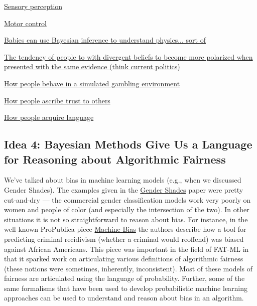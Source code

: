 \documentclass[assignment01_Solutions]{subfiles}
\begin{document}
\bi
\item \href{https://www.sciencedirect.com/science/article/pii/S0022249615000061}{Sensory perception}
\item \href{https://www.nature.com/articles/nn963}{Motor control}
\item \href{http://web.mit.edu/cocosci/Papers/Science-2011-Teglas-1054-9.pdf}{Babies can use Bayesian inference to understand physics... sort of}
\item \href{https://www.ncbi.nlm.nih.gov/pubmed/24730598}{The tendency of people to with divergent beliefs to become more polarized when presented with the same evidence (think current politics)}
\item \href{https://www.sciencedirect.com/science/article/pii/S0022249608001090}{How people behave in a simulated gambling environment}
\item \href{https://arxiv.org/abs/1806.03916}{How people ascribe trust to others}
\item \href{https://www.sciencedirect.com/science/article/pii/S1364661306001318}{How people acquire language}
\ei


\subsection*{Idea 4: Bayesian Methods Give Us a Language for Reasoning about Algorithmic Fairness}

We've talked about bias in machine learning models (e.g., when we discussed Gender Shades).  The examples given in the \href{http://gendershades.org/overview.html}{Gender Shades} paper were pretty cut-and-dry --- the commercial gender classification models work very poorly on women and people of color (and especially the intersection of the two).  In other situations it is not so straightforward to reason about bias. For instance, in the well-known ProPublica piece \href{https://www.propublica.org/article/machine-bias-risk-assessments-in-criminal-sentencing}{Machine Bias} the authors describe how a tool for predicting criminal recidivism (whether a criminal would reoffend) was biased against African Americans.  This piece was important in the field of FAT-ML in that it sparked work on articulating various definitions of algorithmic fairness (these notions were sometimes, inherently, inconsistent).  Most of these models of fairness are articulated using the language of probability.  Further, some of the same formalisms that have been used to develop probabilistic machine learning approaches can be used to understand and reason about bias in an algorithm.
\end{document}

